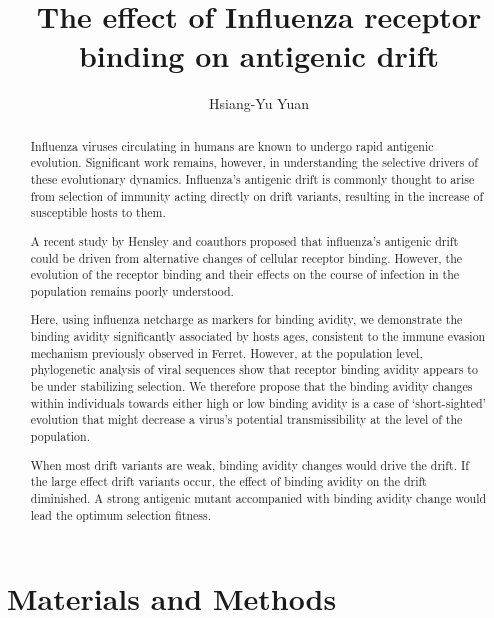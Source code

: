 \documentclass{article}
\begin{document}
\title{The effect of Influenza receptor binding on antigenic drift}
\author{Hsiang-Yu Yuan}
\maketitle


\nocite{*}

\doublespacing
\begin{abstract}

Influenza viruses circulating in humans are known to undergo rapid antigenic evolution. Significant work remains, however, in understanding the selective drivers of these evolutionary dynamics. Influenza’s antigenic drift is commonly thought to arise from selection of immunity acting directly on drift variants, resulting in the increase of susceptible hosts to them. 

A recent study by Hensley and coauthors proposed that influenza’s antigenic drift could be driven from alternative changes of cellular receptor binding. However, the evolution of the receptor binding and their effects on the course of infection in the population remains poorly understood.  

Here, using influenza netcharge as markers for binding avidity, we demonstrate the binding avidity significantly associated by hosts ages, consistent to the immune evasion mechanism previously observed in Ferret. However, at the population level, phylogenetic analysis of viral sequences show that receptor binding avidity appears to be under stabilizing selection. We therefore propose that the binding avidity changes within individuals towards either high or low binding avidity is a case of ‘short-sighted’ evolution that might decrease a virus’s potential transmissibility at the level of the population.

When most drift variants are weak, binding avidity changes would drive the drift. If the large effect drift variants occur, the effect of binding avidity on the drift diminished. A strong antigenic mutant accompanied with binding avidity change would lead the optimum selection fitness.   

\end{abstract}






\section{Materials and Methods}
\end{document}
